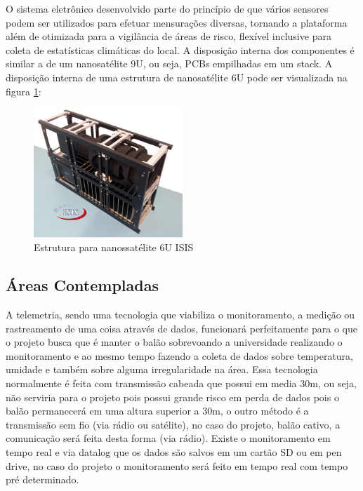
O sistema eletrônico desenvolvido parte do princípio de que vários sensores podem ser utilizados para efetuar mensurações diversas, tornando a plataforma além de otimizada para a vigilância de áreas de risco, flexível inclusive para  coleta de estatísticas climáticas do local. A disposição interna dos componentes é similar a de um nanosatélite 9U, ou seja, PCBs empilhadas em um stack. A disposição interna de uma estrutura de nanosatélite 6U pode ser visualizada na figura \ref{img:nanosatelite}:

	\begin{figure}[H]
		\centering
		\includegraphics[width=0.5\textwidth]{figuras/nano}
		\caption{Estrutura para nanossatélite 6U ISIS }
		\label{img:nanosatelite}
	\end{figure}

\subsection{Áreas Contempladas} %
\label{sub:_reas_contempladas}


	A telemetria, sendo uma tecnologia que viabiliza o monitoramento, a medição ou rastreamento de uma coisa através de dados, funcionará perfeitamente para o que o projeto busca que é manter o balão sobrevoando a universidade realizando o monitoramento e ao mesmo tempo fazendo a coleta de dados sobre temperatura, umidade e também sobre alguma irregularidade na área. Essa tecnologia normalmente é feita com transmissão cabeada que possui em media 30m, ou seja, não serviria para o projeto pois possui grande risco em perda de dados pois o balão permanecerá em uma altura superior a 30m, o outro método é a transmissão sem fio (via rádio ou satélite), no caso do projeto, balão cativo, a comunicação será feita desta forma (via rádio). Existe o monitoramento em tempo real e via datalog que os dados são salvos em um cartão SD ou em pen drive, no caso do projeto o monitoramento será feito em tempo real com tempo pré determinado.

